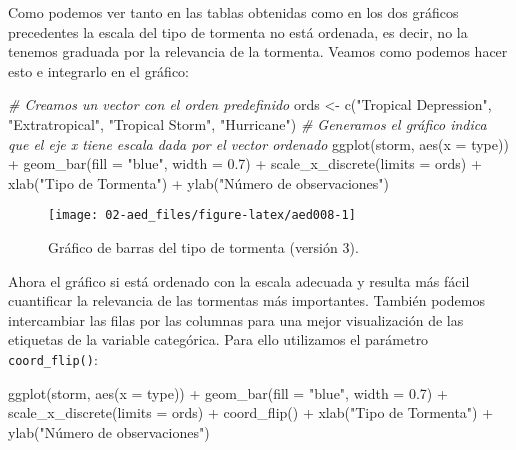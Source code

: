 \documentclass[
]{book}
\newenvironment{Shaded}{\begin{snugshade}}{\end{snugshade}}
\newcommand{\AttributeTok}[1]{\textcolor[rgb]{0.77,0.63,0.00}{#1}}
\newcommand{\CommentTok}[1]{\textcolor[rgb]{0.56,0.35,0.01}{\textit{#1}}}
\newcommand{\FloatTok}[1]{\textcolor[rgb]{0.00,0.00,0.81}{#1}}
\newcommand{\FunctionTok}[1]{\textcolor[rgb]{0.00,0.00,0.00}{#1}}
\newcommand{\NormalTok}[1]{#1}
\newcommand{\OtherTok}[1]{\textcolor[rgb]{0.56,0.35,0.01}{#1}}
\newcommand{\SpecialCharTok}[1]{\textcolor[rgb]{0.00,0.00,0.00}{#1}}
\newcommand{\StringTok}[1]{\textcolor[rgb]{0.31,0.60,0.02}{#1}}
\begin{document}
Como podemos ver tanto en las tablas obtenidas como en los dos gráficos precedentes la escala del tipo de tormenta no está ordenada, es decir, no la tenemos graduada por la relevancia de la tormenta. Veamos como podemos hacer esto e integrarlo en el gráfico:

\begin{Shaded}
\begin{Highlighting}[]
\CommentTok{\# Creamos un vector con el orden predefinido}
\NormalTok{ords }\OtherTok{\textless{}{-}} \FunctionTok{c}\NormalTok{(}\StringTok{"Tropical Depression"}\NormalTok{, }\StringTok{"Extratropical"}\NormalTok{, }\StringTok{"Tropical Storm"}\NormalTok{, }\StringTok{"Hurricane"}\NormalTok{)}
\CommentTok{\# Generamos el gráfico indica que el eje x tiene escala dada por el vector ordenado}
\FunctionTok{ggplot}\NormalTok{(storm, }\FunctionTok{aes}\NormalTok{(}\AttributeTok{x =}\NormalTok{ type)) }\SpecialCharTok{+} 
  \FunctionTok{geom\_bar}\NormalTok{(}\AttributeTok{fill =} \StringTok{"blue"}\NormalTok{, }\AttributeTok{width =} \FloatTok{0.7}\NormalTok{) }\SpecialCharTok{+} 
  \FunctionTok{scale\_x\_discrete}\NormalTok{(}\AttributeTok{limits =}\NormalTok{ ords) }\SpecialCharTok{+}
  \FunctionTok{xlab}\NormalTok{(}\StringTok{"Tipo de Tormenta"}\NormalTok{) }\SpecialCharTok{+} \FunctionTok{ylab}\NormalTok{(}\StringTok{"Número de observaciones"}\NormalTok{)}
\end{Highlighting}
\end{Shaded}

\begin{figure}

{\centering \texttt{[image: 02-aed\_files/figure-latex/aed008-1]} 

}

\caption{Gráfico de barras del tipo de tormenta (versión 3).}\label{fig:aed008}
\end{figure}

Ahora el gráfico si está ordenado con la escala adecuada y resulta más fácil cuantificar la relevancia de las tormentas más importantes. También podemos intercambiar las filas por las columnas para una mejor visualización de las etiquetas de la variable categórica. Para ello utilizamos el parámetro \texttt{coord\_flip()}:

\begin{Shaded}
\begin{Highlighting}[]
\FunctionTok{ggplot}\NormalTok{(storm, }\FunctionTok{aes}\NormalTok{(}\AttributeTok{x =}\NormalTok{ type)) }\SpecialCharTok{+} 
  \FunctionTok{geom\_bar}\NormalTok{(}\AttributeTok{fill =} \StringTok{"blue"}\NormalTok{, }\AttributeTok{width =} \FloatTok{0.7}\NormalTok{) }\SpecialCharTok{+} 
  \FunctionTok{scale\_x\_discrete}\NormalTok{(}\AttributeTok{limits =}\NormalTok{ ords) }\SpecialCharTok{+}
  \FunctionTok{coord\_flip}\NormalTok{() }\SpecialCharTok{+} 
  \FunctionTok{xlab}\NormalTok{(}\StringTok{"Tipo de Tormenta"}\NormalTok{) }\SpecialCharTok{+} \FunctionTok{ylab}\NormalTok{(}\StringTok{"Número de observaciones"}\NormalTok{)}
\end{Highlighting}
\end{Shaded}
\end{document}
